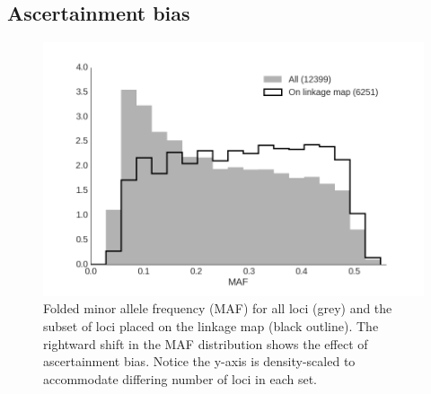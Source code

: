 \documentclass[12pt, one column]{article}
\begin{document}
\subsection*{Ascertainment bias}
\begin{figure}[H]
\includegraphics[scale=.5]{figures/supplemental/ascertainment.png}
\caption[MAF Histogram showing ascertainment bias]{Folded minor allele frequency (MAF) for all loci (grey) and the subset of loci placed on the linkage map (black outline). The rightward shift in the MAF distribution shows the effect of ascertainment bias.  Notice the y-axis is density-scaled to accommodate differing number of loci in each set.}
\end{figure}
\end{document}
